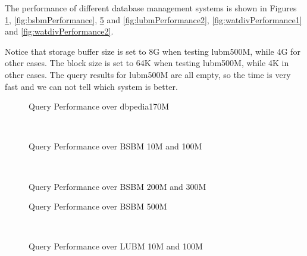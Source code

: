 \documentclass[titlepage, a4paper, 12pt] {article}
\begin{document}
The performance of different database management systems is shown in Figures \ref{fig:dbpediaPerformance}, \ref{fig:bsbmPerformance}, \ref{fig:lubmPerformance1} and \ref{fig:lubmPerformance2}, \ref{fig:watdivPerformance1} and \ref{fig:watdivPerformance2}.

Notice that storage buffer size is set to 8G when testing lubm500M, while 4G for other cases.
The block size is set to 64K when testing lubm500M, while 4K in other cases.
The query results for lubm500M are all empty, so the time is very fast and we can not tell which system is better.

\begin{figure}[b]%
	\resizebox{\columnwidth}{!}{
		
	}
	\caption{Query Performance over dbpedia170M}%
	\label{fig:dbpediaPerformance}
\end{figure}

\begin{figure}[t]%
	\subfigure[bsbm10M]{%
		\resizebox{\columnwidth}{!}{
			
		}
		\label{fig:bsbm10MPerformance}%
	}
	\\
	\subfigure[bsbm100M]{%
		\resizebox{\columnwidth}{!}{
			
		}
		\label{fig:bsbm100MPerformance}%
	}%
	\caption{Query Performance over BSBM 10M and 100M}%
	\label{fig:bsbmPerformance1}
\end{figure}

\begin{figure}[t]%
	\subfigure[bsbm200M]{%
		\resizebox{\columnwidth}{!}{
			
		}
		\label{fig:bsbm200MPerformance}%
	}%
	\\
	\subfigure[bsbm300M]{%
		\resizebox{\columnwidth}{!}{
			
		}
		\label{fig:bsbm300MPerformance}%
	}%
	\caption{Query Performance over BSBM 200M and 300M}%
	\label{fig:bsbmPerformance2}
\end{figure}

\begin{figure}[t]%
	\subfigure[bsbm500M]{%
		\resizebox{\columnwidth}{!}{
			
		}
		\label{fig:bsbm500MPerformance}%
	}%
	\caption{Query Performance over BSBM 500M}%
	\label{fig:bsbmPerformance3}
\end{figure}


\begin{figure}[t]%
	\subfigure[lubm10M]{%
		\resizebox{\columnwidth}{!}{
			
		}
		\label{fig:lubm10MPerformance}%
	}
	\\
	\subfigure[lubm100M]{%
		\resizebox{\columnwidth}{!}{
			
		}
		\label{fig:lubm100MPerformance}%
	}%
	\caption{Query Performance over LUBM 10M and 100M}%
	\label{fig:lubmPerformance1}
\end{figure}
	
\end{document}
